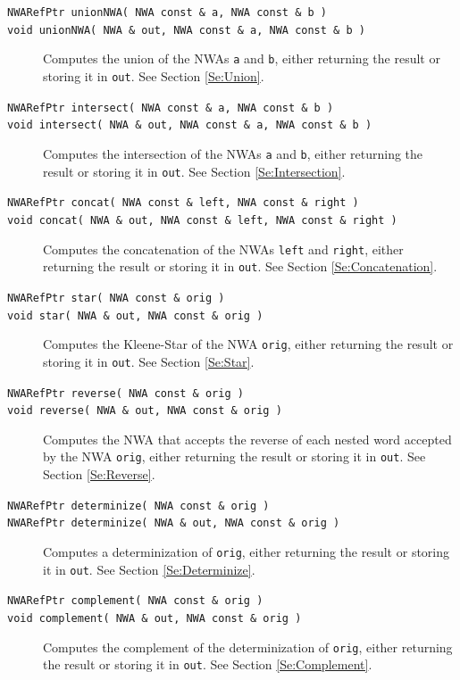 \begin{description}

  \item[\texttt{NWARefPtr unionNWA( NWA const \& a, NWA const \& b )}]
  \item[\texttt{void unionNWA( NWA \& out, NWA const \& a, NWA const \& b )}]
    Computes the union of the NWAs \texttt{a} and \texttt{b},
    either returning the result or storing it in \texttt{out}.
    See Section
    \ref{Se:Union}.

  \item[\texttt{NWARefPtr intersect( NWA const \& a, NWA const \& b )}]
  \item[\texttt{void intersect( NWA \& out, NWA const \& a, NWA const \& b )}]
    Computes the intersection of the NWAs \texttt{a} and \texttt{b},
    either returning the result or storing it in \texttt{out}.
    See Section \ref{Se:Intersection}.

  \item[\texttt{NWARefPtr concat( NWA const \& left, NWA const \& right )}]
  \item[\texttt{void concat( NWA \& out, NWA const \& left, NWA const \& right )}]
    Computes the concatenation of the NWAs \texttt{left} and
    \texttt{right}, either returning the result or storing it in
    \texttt{out}.
    See Section \ref{Se:Concatenation}.

  \item[\texttt{NWARefPtr star( NWA const \& orig )}]
  \item[\texttt{void star( NWA \& out, NWA const \& orig )}]
    Computes the Kleene-Star of the NWA \texttt{orig}, either
    returning the result or storing it in \texttt{out}. See Section
    \ref{Se:Star}.

  \item[\texttt{NWARefPtr reverse( NWA const \& orig )}]
  \item[\texttt{void reverse( NWA \& out, NWA const \& orig )}]
    Computes the NWA that accepts the reverse of each nested word
    accepted by the NWA \texttt{orig}, either returning the result or
    storing it in \texttt{out}. See Section \ref{Se:Reverse}.

  \item[\texttt{NWARefPtr determinize( NWA const \& orig )}]
  \item[\texttt{NWARefPtr determinize( NWA \& out, NWA const \& orig )}]
    Computes a determinization of \texttt{orig}, either returning the
    result or storing it in \texttt{out}.
    See Section \ref{Se:Determinize}.

  \item[\texttt{NWARefPtr complement( NWA const \& orig )}]
  \item[\texttt{void complement( NWA \& out, NWA const \& orig )}]
    Computes the complement of the determinization of \texttt{orig},
    either returning the result or storing it in \texttt{out}.
    See Section
    \ref{Se:Complement}.
\end{description}


